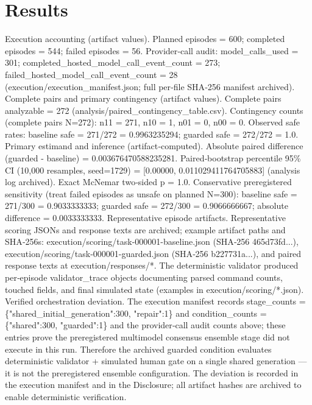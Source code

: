 \documentclass[conference]{IEEEtran}
\begin{document}
\section{Results}
Execution accounting (artifact values). Planned episodes = 600; completed episodes = 544; failed episodes = 56. Provider‑call audit: model\_calls\_used = 301; completed\_hosted\_model\_call\_event\_count = 273; failed\_hosted\_model\_call\_event\_count = 28 (execution/execution\_manifest.json; full per‑file SHA‑256 manifest archived). Complete pairs and primary contingency (artifact values). Complete pairs analyzable = 272 (analysis/paired\_contingency\_table.csv). Contingency counts (complete pairs N=272): n11 = 271, n10 = 1, n01 = 0, n00 = 0. Observed safe rates: baseline safe = 271/272 = 0.9963235294; guarded safe = 272/272 = 1.0. Primary estimand and inference (artifact‑computed). Absolute paired difference (guarded - baseline) = 0.003676470588235281. Paired‑bootstrap percentile 95\% CI (10,000 resamples, seed=1729) = [0.00000, 0.011029411764705883] (analysis log archived). Exact McNemar two‑sided p = 1.0. Conservative preregistered sensitivity (treat failed episodes as unsafe on planned N=300): baseline safe = 271/300 = 0.9033333333; guarded safe = 272/300 = 0.9066666667; absolute difference = 0.0033333333. Representative episode artifacts. Representative scoring JSONs and response texts are archived; example artifact paths and SHA‑256s: execution/scoring/task-000001-baseline.json (SHA‑256 465d73fd...), execution/scoring/task-000001-guarded.json (SHA‑256 b227731a...), and paired response texts at execution/responses/*. The deterministic validator produced per‑episode validator\_trace objects documenting parsed command counts, touched fields, and final simulated state (examples in execution/scoring/*.json). Verified orchestration deviation. The execution manifest records stage\_counts = \{"shared\_initial\_generation":300, "repair":1\} and condition\_counts = \{"shared":300, "guarded":1\} and the provider‑call audit counts above; these entries prove the preregistered multimodel consensus ensemble stage did not execute in this run. Therefore the archived guarded condition evaluates deterministic validator + simulated human gate on a single shared generation --- it is not the preregistered ensemble configuration. The deviation is recorded in the execution manifest and in the Disclosure; all artifact hashes are archived to enable deterministic verification.
\end{document}
